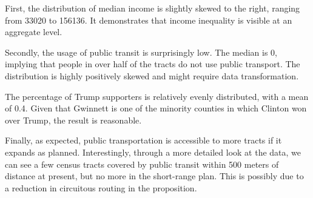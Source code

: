 \documentclass[
]{article}
\begin{document}
First, the distribution of median income is slightly skewed to the
right, ranging from 33020 to 156136. It demonstrates that income
inequality is visible at an aggregate level.

Secondly, the usage of public transit is surprisingly low. The median is
0, implying that people in over half of the tracts do not use public
transport. The distribution is highly positively skewed and might
require data transformation.

The percentage of Trump supporters is relatively evenly distributed,
with a mean of 0.4. Given that Gwinnett is one of the minority counties
in which Clinton won over Trump, the result is reasonable.

Finally, as expected, public transportation is accessible to more tracts
if it expands as planned. Interestingly, through a more detailed look at
the data, we can see a few census tracts covered by public transit
within 500 meters of distance at present, but no more in the short-range
plan. This is possibly due to a reduction in circuitous routing in the
proposition.
\end{document}
